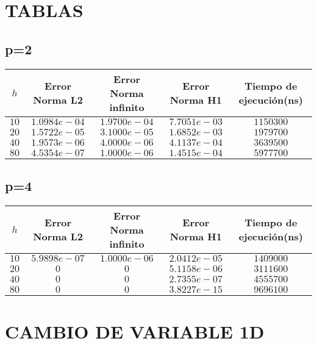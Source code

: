 \documentclass[12pt]{article}
\begin{document}
\section{TABLAS}
\subsection{p=2}

\begin{center}
\begin{tabular} {|c|c|c|c|c|}
\hline
$h$ & Error Norma L2 & Error Norma infinito & Error Norma H1 & Tiempo de ejecución(ns)\\
\hline
$10$ &   $1.0984e-04$ & $1.9700e-04$ & $7.7051e-03$  & $1150300$ \\
$20$ &   $1.5722e-05$ &  $3.1000e-05$ & $1.6852e-03$ & $1979700$   \\
$40$ &   $1.9573e-06$ &  $4.0000e-06$ & $4.1137e-04$ & $3639500$   \\
$80$ &   $4.5354e-07$ &  $1.0000e-06$ & $1.4515e-04$ & $5977700$   \\

\hline
\end{tabular}
\vspace{3cm}
\end{center}


\subsection{p=4}
\begin{center}
\begin{tabular} {|c|c|c|c|c|}
\hline
$h$ & Error Norma L2 & Error Norma infinito & Error Norma H1 & Tiempo de ejecución(ns)\\
\hline
$10$ &   $5.9898e-07$ & $1.0000e-06$  & $2.0412e-05$ & $1409000$ \\
$20$ &   $0$   &  $0$ & $5.1158e-06$ & $3111600$   \\
$40$ &   $0$   &  $0$ & $2.7355e-07$ & $4555700$   \\
$80$ &   $0$   &  $0$ & $3.8227e-15 $ & $9696100$   \\

\hline
\end{tabular}
\vspace{3cm}
\end{center}

\section{CAMBIO DE VARIABLE 1D}
\end{document}
